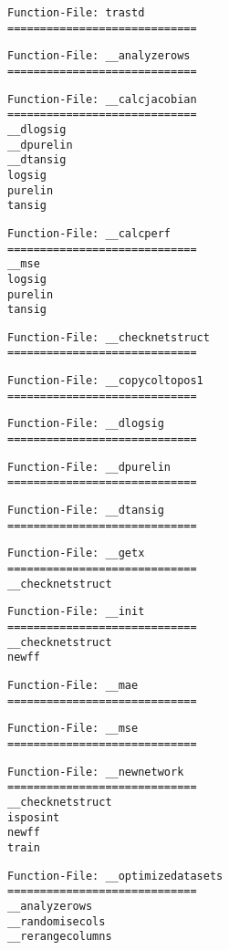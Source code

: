 \begin{verbatim}
Function-File: trastd
=============================
\end{verbatim}
\begin{verbatim}
Function-File: __analyzerows
=============================
\end{verbatim}
\begin{verbatim}
Function-File: __calcjacobian
=============================
__dlogsig
__dpurelin
__dtansig
logsig
purelin
tansig
\end{verbatim}
\begin{verbatim}
Function-File: __calcperf
=============================
__mse
logsig
purelin
tansig
\end{verbatim}
\begin{verbatim}
Function-File: __checknetstruct
=============================
\end{verbatim}
\begin{verbatim}
Function-File: __copycoltopos1
=============================
\end{verbatim}
\begin{verbatim}
Function-File: __dlogsig
=============================
\end{verbatim}
\begin{verbatim}
Function-File: __dpurelin
=============================
\end{verbatim}
\begin{verbatim}
Function-File: __dtansig
=============================
\end{verbatim}
\begin{verbatim}
Function-File: __getx
=============================
__checknetstruct
\end{verbatim}
\begin{verbatim}
Function-File: __init
=============================
__checknetstruct
newff
\end{verbatim}
\begin{verbatim}
Function-File: __mae
=============================
\end{verbatim}
\begin{verbatim}
Function-File: __mse
=============================
\end{verbatim}
\begin{verbatim}
Function-File: __newnetwork
=============================
__checknetstruct
isposint
newff
train
\end{verbatim}
\begin{verbatim}
Function-File: __optimizedatasets
=============================
__analyzerows
__randomisecols
__rerangecolumns
\end{verbatim}
